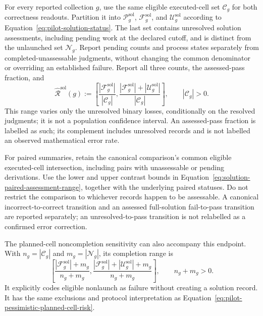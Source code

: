 \documentclass[10pt]{article} %
\providecommand{\1}{\mathbf{1}}  %
\theoremstyle{remark}
\theoremstyle{definition}
\begin{document}
For every reported collection $g$, use the same eligible executed-cell
set $\mathcal C_g$ for both correctness readouts. Partition it into
$\mathcal P_g^{\mathrm{sol}}$,
$\mathcal F_g^{\mathrm{sol}}$, and
$\mathcal U_g^{\mathrm{sol}}$ according to
Equation~\ref{eq:pilot-solution-status}. The last set contains unresolved solution assessments, including pending
work at the declared cutoff, and is distinct from the unlaunched
set $\mathcal N_g$. Report pending counts and process states separately
from completed-unassessable judgments, without changing the common
denominator or overriding an established failure.
Report all three counts, the assessed-pass fraction, and
\begin{equation}
\widehat{\mathcal R}^{\mathrm{sol}}(g)
:=
\left[
\frac{|\mathcal F_g^{\mathrm{sol}}|}{|\mathcal C_g|},
\frac{|\mathcal F_g^{\mathrm{sol}}|
+|\mathcal U_g^{\mathrm{sol}}|}{|\mathcal C_g|}
\right],
\qquad |\mathcal C_g|>0.
\label{eq:pilot-solution-assessment-range}
\end{equation}
This range varies only the unresolved binary losses, conditionally on the
resolved judgments; it is not a population confidence interval. An assessed-pass fraction is labelled as such;
its complement includes unresolved records and is not labelled an
observed mathematical error rate.

For paired summaries, retain the canonical comparison's common eligible
executed-cell intersection, including pairs with unassessable or pending derivations.
Use the lower and upper contrast bounds in
Equation~\ref{eq:solution-paired-assessment-range}, together with the
underlying paired statuses. Do not restrict the comparison to whichever
records happen to be assessable. A canonical incorrect-to-correct
transition and an assessed full-solution fail-to-pass transition are
reported separately; an unresolved-to-pass transition is not relabelled
as a confirmed error correction.

The planned-cell noncompletion sensitivity can also accompany this
endpoint. With $n_g=|\mathcal C_g|$ and
$m_g=|\mathcal N_g|$, its completion range is
\begin{equation}
\left[
\frac{|\mathcal F_g^{\mathrm{sol}}|+m_g}{n_g+m_g},
\frac{|\mathcal F_g^{\mathrm{sol}}|
+|\mathcal U_g^{\mathrm{sol}}|+m_g}{n_g+m_g}
\right],
\qquad n_g+m_g>0.
\label{eq:pilot-solution-planned-range}
\end{equation}
It explicitly codes eligible nonlaunch as failure without creating a
solution record. It has the same exclusions and protocol interpretation
as Equation~\ref{eq:pilot-pessimistic-planned-cell-risk}.
\end{document}
